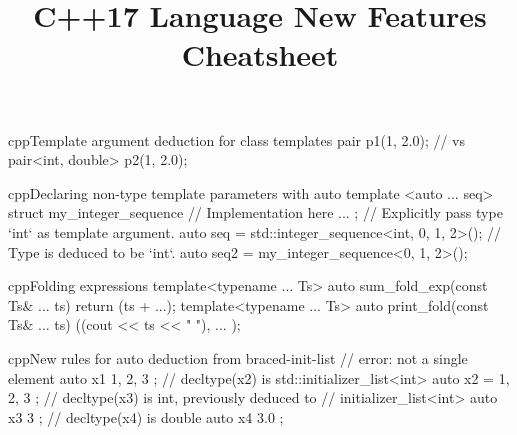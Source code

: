 \documentclass[10pt,a4paper]{article}
\title{\color{w3schools}C++17 Language New Features Cheatsheet
}
\begin{document}
\maketitle
\small
\begin{multicols}{3}

\thispagestyle{empty}
\scriptsize

% 




\begin{codebox}{cpp}{Template argument deduction for class templates}
pair p1(1, 2.0);
// vs
pair<int, double> p2(1, 2.0);

\end{codebox}

\begin{codebox}{cpp}{Declaring non-type template parameters with auto}
template <auto ... seq>
struct my_integer_sequence {
  // Implementation here ...
};
// Explicitly pass type `int` as template argument.
auto seq = std::integer_sequence<int, 0, 1, 2>();
// Type is deduced to be `int`.
auto seq2 = my_integer_sequence<0, 1, 2>();

\end{codebox}

\begin{codebox}{cpp}{Folding expressions}
template<typename ... Ts>
auto sum_fold_exp(const Ts& ... ts) {
  return (ts + ...);
}
template<typename ... Ts>
auto print_fold(const Ts& ... ts)
{
  ((cout << ts << " "), ... );
}

\end{codebox}

\begin{codebox}{cpp}{New rules for auto deduction from braced-init-list}
// error: not a single element
auto x1{ 1, 2, 3 };
// decltype(x2) is std::initializer_list<int>
auto x2 = { 1, 2, 3 };
// decltype(x3) is int, previously deduced to
// initializer_list<int>
auto x3{ 3 };
// decltype(x4) is double
auto x4{ 3.0 };


\end{codebox}
\end{multicols}
\end{document}
